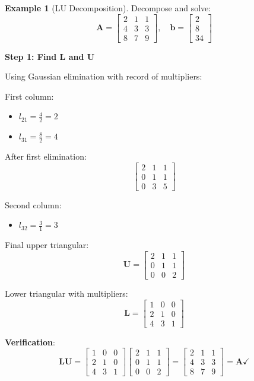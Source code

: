 \documentclass[12pt,a4paper]{article}
\theoremstyle{definition}
\newtheorem{example}{Example}[section]
\begin{document}
\begin{example}[LU Decomposition]
Decompose and solve:
\[
\mathbf{A} = \begin{bmatrix}
2 & 1 & 1 \\
4 & 3 & 3 \\
8 & 7 & 9
\end{bmatrix}, \quad
\mathbf{b} = \begin{bmatrix}
2 \\
8 \\
34
\end{bmatrix}
\]

\textbf{Step 1: Find L and U}

Using Gaussian elimination with record of multipliers:

First column:
\begin{itemize}
\item $l_{21} = \frac{4}{2} = 2$
\item $l_{31} = \frac{8}{2} = 4$
\end{itemize}

After first elimination:
\[
\begin{bmatrix}
2 & 1 & 1 \\
0 & 1 & 1 \\
0 & 3 & 5
\end{bmatrix}
\]

Second column:
\begin{itemize}
\item $l_{32} = \frac{3}{1} = 3$
\end{itemize}

Final upper triangular:
\[
\mathbf{U} = \begin{bmatrix}
2 & 1 & 1 \\
0 & 1 & 1 \\
0 & 0 & 2
\end{bmatrix}
\]

Lower triangular with multipliers:
\[
\mathbf{L} = \begin{bmatrix}
1 & 0 & 0 \\
2 & 1 & 0 \\
4 & 3 & 1
\end{bmatrix}
\]

\textbf{Verification}:
\[
\mathbf{LU} = \begin{bmatrix}
1 & 0 & 0 \\
2 & 1 & 0 \\
4 & 3 & 1
\end{bmatrix}
\begin{bmatrix}
2 & 1 & 1 \\
0 & 1 & 1 \\
0 & 0 & 2
\end{bmatrix}
= \begin{bmatrix}
2 & 1 & 1 \\
4 & 3 & 3 \\
8 & 7 & 9
\end{bmatrix} = \mathbf{A} \checkmark
\]


\end{example}
\end{document}
